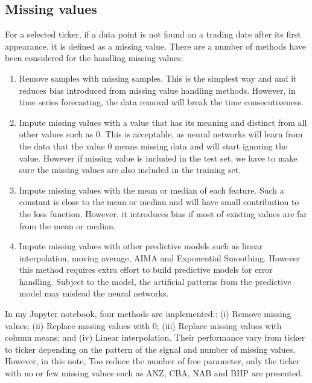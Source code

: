 \documentclass[a4paper, 11pt, usenatbib]{article}
\begin{document}
\subsection{Missing values}
For a selected ticker, if a data point is not found on a trading date after its first appearance, it is defined as a missing value. There are a number of methods have been considered for the handling missing values:
\begin{enumerate}


\item Remove samples with missing samples. This is the simplest way and and it reduces bias introduced from missing value handling methods. However, in time series forecasting, the data removal will break the time consecutiveness.

\item Impute missing values with a value that has its meaning and distinct from all other values such as 0. This is acceptable, as neural networks will learn from the data that the value 0 means missing data and will start ignoring the value. However if missing value is included in the test set, we have to make sure the missing values are also included in the training set.

\item Impute missing values with the mean or median of each feature. Such a constant is close to the mean or median and will have small contribution to the loss function. However, it introduces bias if most of existing values are far from the mean or median.

\item Impute missing values with other predictive models such as linear interpolation, moving average, AIMA and Exponential Smoothing. However this method requires extra effort to build predictive models for error handling. Subject to the model, the artificial patterns from the predictive model may mislead the neural networks.
 
\end{enumerate}

In my Jupyter notebook, four methods are implemented:: (i) Remove missing values; (ii) Replace missing values with 0; (iii) Replace missing values with column means; and (iv) Linear interpolation. Their performance vary from ticker to ticker depending on the pattern of the signal and number of missing values. However, in this note, Too reduce the number of free parameter, only the ticker with no or few missing values such as ANZ, CBA, NAB and BHP are presented.
\end{document}
